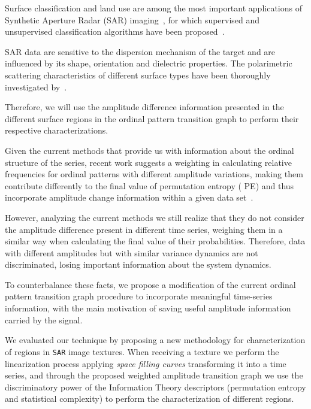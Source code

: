 \documentclass{isprs}
\begin{document}
Surface classification and land use are among the most important applications of Synthetic Aperture Radar (SAR) imaging~\citep{Pottier2004Unsupervised}, for which supervised and unsupervised classification algorithms have been proposed~\citep{Bhattacharya2018Unsupervised,Chen1996multifrequency,ZYL1992Bayesian}.

SAR data are sensitive to the dispersion mechanism of the target and are influenced by its shape, orientation and dielectric properties.
The polarimetric scattering characteristics of different surface types have been thoroughly investigated by~\cite{Moriyama2004study, Fujita2004Polarimetric}.

Therefore, we will use the amplitude difference information presented in the different surface regions in the ordinal pattern transition graph to perform their respective characterizations.
	
Given the current methods that provide us with information about the ordinal structure of the series, recent work suggests a weighting in calculating relative frequencies for ordinal patterns with different amplitude variations, making them contribute differently to the final value of permutation entropy ( PE) and thus incorporate amplitude change information within a given data set~\citep{Fadlallah2013Weightedpermutation}.
	
However, analyzing the current methods we still realize that they do not consider the amplitude difference present in different time series, weighing them in a similar way when calculating the final value of their probabilities.
Therefore, data with different amplitudes but with similar variance dynamics are not discriminated, losing important information about the system dynamics.
	
To counterbalance these facts, we propose a modification of the current ordinal pattern transition graph procedure to incorporate meaningful time-series information, with the main motivation of saving useful amplitude information carried by the signal.
	
We evaluated our technique by proposing a new methodology for characterization of regions in \texttt{SAR} image textures.
When receiving a texture we perform the linearization process applying \textit{space filling curves} transforming it into a time series, and through the proposed weighted amplitude transition graph we use the discriminatory power of the Information Theory descriptors (permutation entropy and statistical complexity) to perform the characterization of different regions.
	
\end{document}
